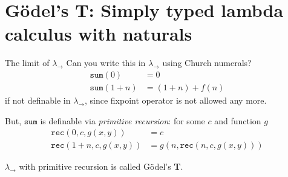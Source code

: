 \section{G\"odel's \textbf{T}: Simply typed lambda calculus with naturals}
\begin{frame}{The limit of $\lambda_\to$}
  Can you write this in $\lambda_\to$ using Church numerals?
  \begin{align*}
    \mathtt{sum}(0)     & = 0 \\
    \mathtt{sum}(1 + n) & = (1 + n) + f(n)
  \end{align*}
  if not definable in $\lambda_\to$, since fixpoint operator is not allowed any more. 

  But, $\mathtt{sum}$ is definable via \emph{primitive recursion}:
  for some $c$ and function $g$
  \begin{align*}
    \mathtt{rec}(0, c, g(x, y))       &= c \\
    \mathtt{rec}(1 + n, c, g(x, y))   &= g(n, \mathtt{rec}(n, c, g(x, y)))
  \end{align*}

  $\lambda_\to$ with primitive recursion is called G\"odel's \textbf{T}.
\end{frame}

